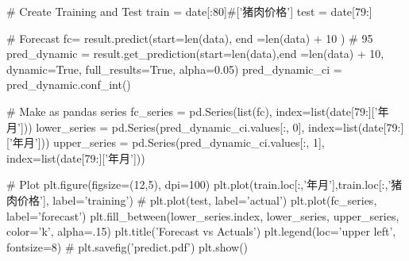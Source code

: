 \documentclass[a4paper,AutoFakeBold,AutoFakeSlant]{ctexart}
\begin{document}
\begin{python}
  # Create Training and Test
  train = date[:80]#['猪肉价格']
  test = date[79:]

  # Forecast
  fc= result.predict(start=len(data), end =len(data) + 10 )  # 95%
  pred_dynamic = result.get_prediction(start=len(data),end =len(data) + 10,  dynamic=True, full_results=True, alpha=0.05)
  pred_dynamic_ci = pred_dynamic.conf_int()

  # Make as pandas series
  fc_series = pd.Series(list(fc), index=list(date[79:]['年月']))
  lower_series = pd.Series(pred_dynamic_ci.values[:, 0], index=list(date[79:]['年月']))
  upper_series = pd.Series(pred_dynamic_ci.values[:, 1], index=list(date[79:]['年月']))

  # Plot
  plt.figure(figsize=(12,5), dpi=100)
  plt.plot(train.loc[:,'年月'],train.loc[:,'猪肉价格'], label='training')
  # plt.plot(test, label='actual')
  plt.plot(fc_series, label='forecast')
  plt.fill_between(lower_series.index, lower_series, upper_series, 
                  color='k', alpha=.15)
  plt.title('Forecast vs Actuals')
  plt.legend(loc='upper left', fontsize=8)
  # plt.savefig('predict.pdf')
  plt.show()
\end{python}



\end{document}

